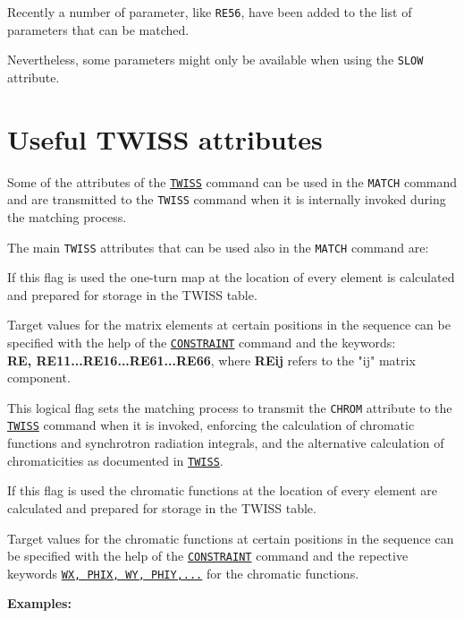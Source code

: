 Recently a number of parameter, like \texttt{RE56}, have been added to the
list of parameters that can be matched. 

Nevertheless, some parameters might only be available when using the
\texttt{SLOW} attribute.
 
\section{Useful TWISS attributes}

Some of the attributes of the \hyperref[chap:twiss]{\texttt{TWISS}} command
can be used in the \texttt{MATCH} command and are transmitted to the
\texttt{TWISS} command when it is internally invoked during the matching process. 

The main \texttt{TWISS} attributes that can be used also in the \texttt{MATCH}
command are:

\begin{madlist}
   If this flag is used the one-turn map at the location of every
  element is calculated and prepared for storage in the TWISS table.
 
  Target values for the matrix elements at certain positions in the
  sequence can be specified with the help of the
  \hyperref[sec:constraint]{\texttt{CONSTRAINT}} command and the keywords:\\
  \textbf{RE, RE11...RE16...RE61...RE66}, where \textbf{REij} refers to
  the "ij" matrix component.
  

   This logical flag sets the matching process to transmit
  the \texttt{CHROM} attribute to the \hyperref[chap:twiss]{\texttt{TWISS}}
  command when it is invoked, enforcing the calculation of chromatic
  functions and synchrotron radiation integrals, and the alternative
  calculation of chromaticities as documented in
  \hyperref[chap:twiss]{\texttt{TWISS}}.

  If this flag is used the chromatic functions at the location of
  every element are calculated and prepared for storage in the TWISS
  table. 
  
  Target values for the chromatic functions at certain positions in the
  sequence can be specified with the help of the
  \hyperref[sec:constraint]{\texttt{CONSTRAINT}} command and the
  repective keywords 
  \hyperref[subsec:tables-chrom]{\texttt{WX, PHIX, WY, PHIY,...}} for
  the chromatic functions. 
\end{madlist}


\textbf{Examples:}

